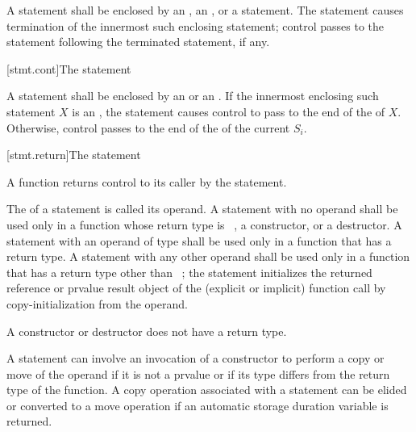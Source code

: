 \pnum
A  statement shall be enclosed by
%
%
an ,
an , or
a  statement.
The  statement causes
termination of the innermost such enclosing statement;
control passes to the statement following the
terminated statement, if any.

[stmt.cont]{The  statement}%

\pnum
A 
statement shall be enclosed by
%
an  or an .
If the innermost enclosing such statement $X$
is an ,
the  statement
causes control to pass to the end of the  of $X$.
Otherwise, control passes to the end of the 
of the current $S_{i}$.

[stmt.return]{The  statement}%
%
%

\pnum
A function returns control to its caller by the  statement.

\pnum
The 
of a  statement is called its operand. A  statement with
no operand shall be used only in a function whose return type is
\cv{}~, a constructor, or a
destructor.
%
%
A  statement with an operand of type  shall be used only
in a function that has a \cv{}~ return type.
A  statement with any other operand shall be used only
in a function that has a return type other than \cv{}~;
%
the  statement initializes the
returned reference or prvalue result object
of the (explicit or implicit) function call
by copy-initialization from the operand.
\begin{note}
A constructor or destructor does not have a return type.
\end{note}
\begin{note}
A  statement can involve
an invocation of a constructor to perform a copy or move of the operand
if it is not a prvalue or if its type differs from the return type of the function.
A copy operation associated with a  statement can be elided or
converted to a move operation if an automatic storage duration variable is returned.
\end{note}

